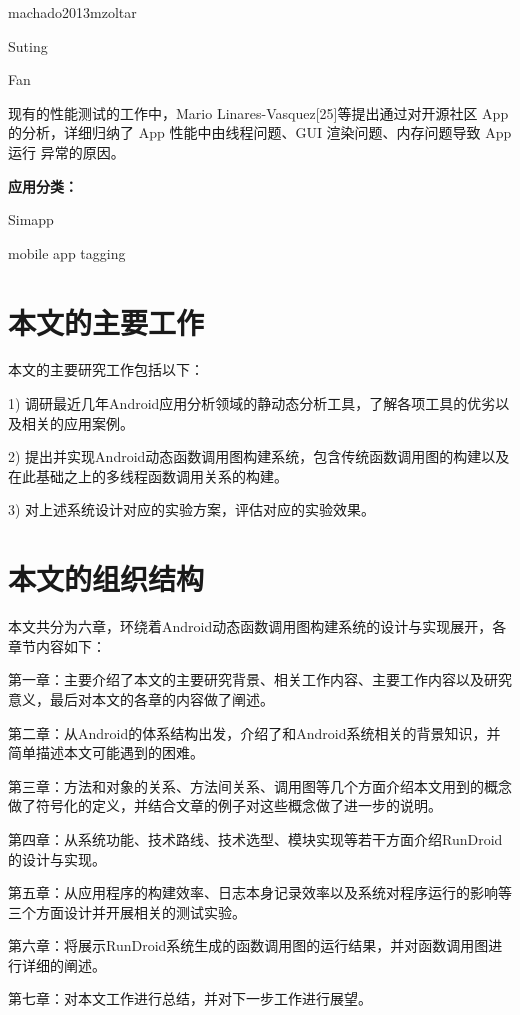 machado2013mzoltar~\cite{machado2013mzoltar}

Suting~\cite{androidtest2}

Fan~\cite{fan2018efficiently, fan2018large}

现有的性能测试的工作中，Mario Linares-Vasquez[25]等提出通过对开源社区 App 的分析，详细归纳了 App 性能中由线程问题、GUI 渲染问题、内存问题导致 App 运行 异常的原因。

\textbf{应用分类：}

Simapp~\cite{chen2015simapp}

mobile app tagging ~\cite{chen2016mobile}



\section{本文的主要工作}

本文的主要研究工作包括以下：

1)	调研最近几年Android应用分析领域的静动态分析工具，了解各项工具的优劣以及相关的应用案例。

2)	提出并实现Android动态函数调用图构建系统，包含传统函数调用图的构建以及在此基础之上的多线程函数调用关系的构建。

3)	对上述系统设计对应的实验方案，评估对应的实验效果。

\section{本文的组织结构}

本文共分为六章，环绕着Android动态函数调用图构建系统的设计与实现展开，各章节内容如下：

第一章：主要介绍了本文的主要研究背景、相关工作内容、主要工作内容以及研究意义，最后对本文的各章的内容做了阐述。

第二章：从Android的体系结构出发，介绍了和Android系统相关的背景知识，并简单描述本文可能遇到的困难。

第三章：方法和对象的关系、方法间关系、调用图等几个方面介绍本文用到的概念做了符号化的定义，并结合文章的例子对这些概念做了进一步的说明。


第四章：从系统功能、技术路线、技术选型、模块实现等若干方面介绍RunDroid的设计与实现。

第五章：从应用程序的构建效率、日志本身记录效率以及系统对程序运行的影响等三个方面设计并开展相关的测试实验。

第六章：将展示RunDroid系统生成的函数调用图的运行结果，并对函数调用图进行详细的阐述。

第七章：对本文工作进行总结，并对下一步工作进行展望。
